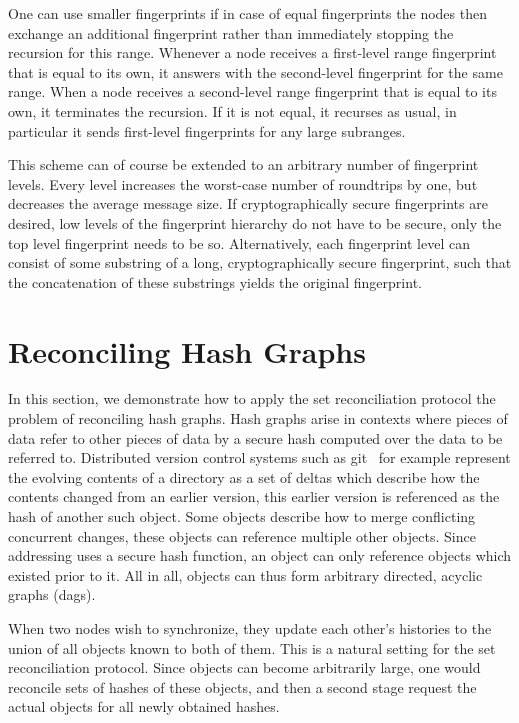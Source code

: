 One can use smaller fingerprints if in case of equal fingerprints the nodes then exchange an additional fingerprint rather than immediately stopping the recursion for this range. Whenever a node receives a first-level range fingerprint that is equal to its own, it answers with the second-level fingerprint for the same range. When a node receives a second-level range fingerprint that is equal to its own, it terminates the recursion. If it is not equal, it recurses as usual, in particular it sends first-level fingerprints for any large subranges.

This scheme can of course be extended to an arbitrary number of fingerprint levels. Every level increases the worst-case number of roundtrips by one, but decreases the average message size. If cryptographically secure fingerprints are desired, low levels of the fingerprint hierarchy do not have to be secure, only the top level fingerprint needs to be so. Alternatively, each fingerprint level can consist of some substring of a long, cryptographically secure fingerprint, such that the concatenation of these substrings yields the original fingerprint.

\section{Reconciling Hash Graphs}
\label{set-reconciliation-graphs}

In this section, we demonstrate how to apply the set reconciliation protocol the problem of reconciling hash graphs. Hash graphs arise in contexts where pieces of data refer to other pieces of data by a secure hash computed over the data to be referred to. Distributed version control systems such as git~\cite{chacon2014pro} for example represent the evolving contents of a directory as a set of deltas which describe how the contents changed from an earlier version, this earlier version is referenced as the hash of another such object. Some objects describe how to merge conflicting concurrent changes, these objects can reference multiple other objects. Since addressing uses a secure hash function, an object can only reference objects which existed prior to it. All in all, objects can thus form arbitrary directed, acyclic graphs (dags).

When two nodes wish to synchronize, they update each other's histories to the union of all objects known to both of them. This is a natural setting for the set reconciliation protocol. Since objects can become arbitrarily large, one would reconcile sets of hashes of these objects, and then a second stage request the actual objects for all newly obtained hashes.

